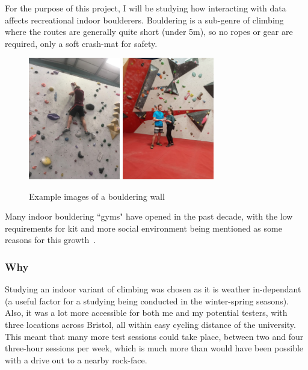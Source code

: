 For the purpose of this project, I will be studying how interacting with data affects recreational indoor boulderers.
Bouldering is a sub-genre of climbing where the routes are generally quite short (under 5m), so no ropes or gear are required, only a soft crash-mat for safety.
\begin{figure}[h]
\centering
\includegraphics[width=4cm]{imgs/boulder}
\includegraphics[width=4cm]{imgs/wall}
\caption{Example images of a bouldering wall}
\label{fig:playstore}
\end{figure}

Many indoor bouldering ``gyms" have opened in the past decade, with the low requirements for kit and more social environment being mentioned as some reasons for this growth~\cite{socialclimb}.

\subsubsection{Why}
Studying an indoor variant of climbing was chosen as it is weather in-dependant (a useful factor for a studying being conducted in the winter-spring seasons).
Also, it was a lot more accessible for both me and my potential testers, with three locations across Bristol, all within easy cycling distance of the university.
This meant that many more test sessions could take place, between two and four three-hour sessions per week, which is much more than would have been possible with a drive out to a nearby rock-face.

